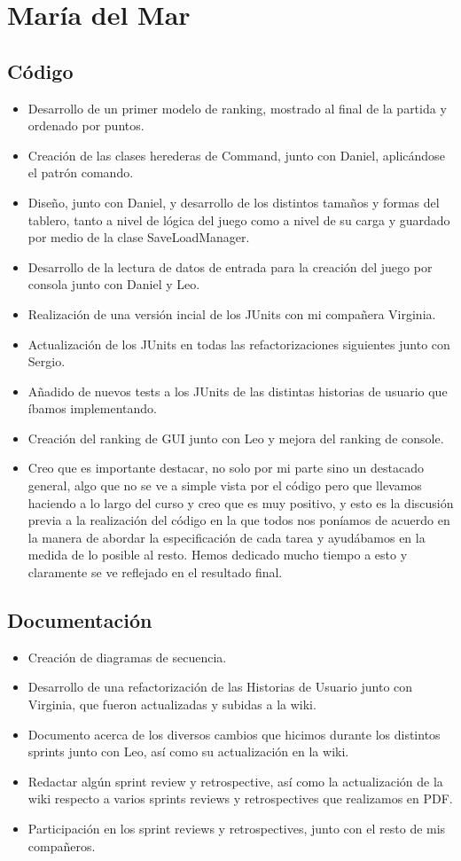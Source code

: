 \documentclass{article}
\begin{document}
\section*{María del Mar}
\subsection*{Código}
\begin{itemize}
\item Desarrollo de un primer modelo de ranking, mostrado al final de la partida y ordenado por puntos.
\item Creación de las clases herederas de Command, junto con Daniel, aplicándose el patrón comando.
\item Diseño, junto con Daniel, y desarrollo de los distintos tamaños y formas del tablero, tanto a nivel de lógica del juego como a nivel de su carga y guardado por medio de la clase SaveLoadManager.
\item Desarrollo de la lectura de datos de entrada para la creación del juego por consola junto con Daniel y Leo.
\item Realización de una versión incial de los JUnits con mi compañera Virginia.
\item Actualización de los JUnits en todas las refactorizaciones siguientes junto con Sergio.
\item Añadido de nuevos tests a los JUnits de las distintas historias de usuario que íbamos implementando.
\item Creación del ranking de GUI junto con Leo y mejora del ranking de console.
\item Creo que es importante destacar, no solo por mi parte sino un destacado general, algo que no se ve a simple vista por el código pero que llevamos haciendo a lo largo del curso y creo que es muy positivo, y esto es la discusión previa a la realización del código en la que todos nos poníamos de acuerdo en la manera de abordar la especificación de cada tarea y ayudábamos en la medida de lo posible al resto. Hemos dedicado mucho tiempo a esto y claramente se ve reflejado en el resultado final.
\end{itemize}

\subsection*{Documentación}
\begin{itemize}
\item Creación de diagramas de secuencia.
\item Desarrollo de una refactorización de las Historias de Usuario junto con Virginia, que fueron actualizadas y subidas a la wiki.
\item Documento acerca de los diversos cambios que hicimos durante los distintos sprints junto con Leo, así como su actualización en la wiki.
\item Redactar algún sprint review y retrospective, así como la actualización de la wiki respecto a varios sprints reviews y retrospectives que realizamos en PDF.
\item Participación en los sprint reviews y retrospectives, junto con el resto de mis compañeros.

\end{itemize}
\end{document}
